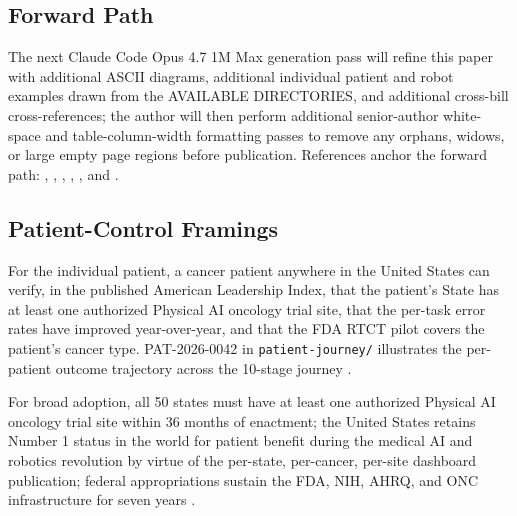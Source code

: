 \subsection{Forward Path}

The next Claude Code Opus 4.7 1M Max generation pass will refine
this paper with additional ASCII diagrams, additional individual
patient and robot examples drawn from the AVAILABLE DIRECTORIES, and
additional cross-bill cross-references; the author will then
perform additional senior-author white-space and table-column-width
formatting passes to remove any orphans, widows, or large empty
page regions before publication. References anchor the forward
path: \cite{kawchak_2026_20045457}, \cite{fda_rtct_press_2026},
\cite{kawchak_2026_19994945}, \cite{kawchak_2026_19396256},
\cite{kawchak_2026_19244918}, and \cite{kawchak_2026_18810541}.

\subsection{Patient-Control Framings}

For the individual patient, a cancer patient anywhere in the
United States can verify, in the published American Leadership
Index, that the patient's State has at least one authorized
Physical AI oncology trial site, that the per-task error rates have
improved year-over-year, and that the FDA RTCT pilot covers the
patient's cancer type. PAT-2026-0042 in \texttt{patient-journey/}
illustrates the per-patient outcome trajectory across the 10-stage
journey \cite{kawchak_2026_19119939}.

For broad adoption, all 50 states must have at least one authorized
Physical AI oncology trial site within 36 months of enactment; the
United States retains Number 1 status in the world for patient
benefit during the medical AI and robotics revolution by virtue of
the per-state, per-cancer, per-site dashboard publication; federal
appropriations sustain the FDA, NIH, AHRQ, and ONC infrastructure
for seven years \cite{kawchak_2026_19244918, kawchak_2026_19994945,
kawchak_2026_19396256}.
